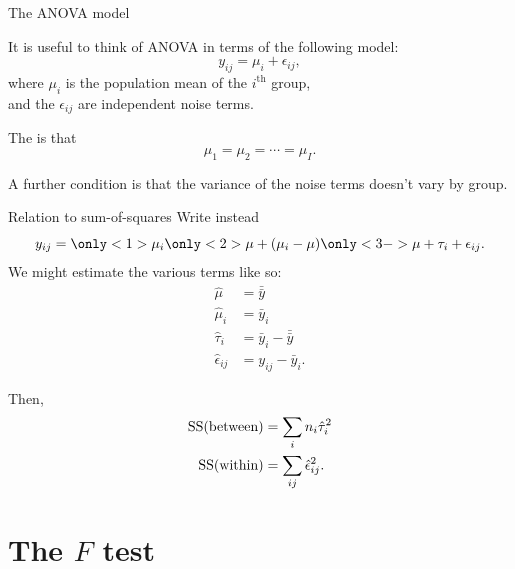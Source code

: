 \begin{frame}{The ANOVA model}

    It is useful to think of ANOVA in terms of the following model:
    \[
        y_{ij} = \mu_i + \epsilon_{ij} ,
    \]
    where $\mu_i$ is the population mean of the $i^\mathrm{th}$ group, \\
    and the $\epsilon_{ij}$ are independent noise terms.

    \vspace{2em}

    The  is that
    \[ \mu_1 = \mu_2 = \cdots = \mu_I .\]


    \vspace{2em}

    A further condition is that the variance of the noise terms doesn't vary by group.

\end{frame}


\begin{frame}{Relation to sum-of-squares}
    Write instead
    \[
        y_{ij} = \only<1>{\mu_i} \only<2>{\mu + (\mu_i - \mu)} \only<3->{\mu + \tau_i} + \epsilon_{ij} .
    \]
    We might estimate the various terms like so:
    \begin{align*}
        \hat \mu &= \bar{\bar y} \\
        \hat \mu_i &= \bar y_i \\
        \hat \tau_i &= \bar y_i - \bar{\bar y} \\
        \hat \epsilon_{ij} &= y_{ij} - \bar y_i .
    \end{align*}

    \vspace{2em}

    Then,
    \begin{align*}
        \SS(\text{between}) &= \sum_{i} n_i \hat \tau_i^2 \\
        \SS(\text{within}) &= \sum_{ij} \hat \epsilon_{ij}^2 .
    \end{align*}

\end{frame}

\section{The $F$ test}

